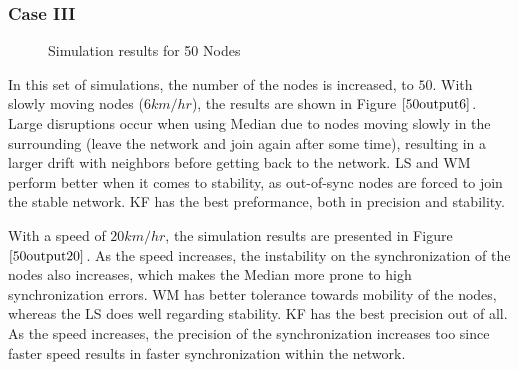 \documentclass[journal]{IEEEtran}
\begin{document}
\subsubsection{\textbf{Case III}}
\begin{figure}
\centerline{  \hfil {}} \caption{Simulation results for 50 Nodes}
\label{50output}
\end{figure}
In this set of simulations, the number of the nodes is increased, to
$50$. With slowly moving nodes ($6km/hr$), the results are shown in
Figure $\ref{50output6}$. Large disruptions occur when using Median
due to nodes moving slowly in the surrounding (leave the network and
join again after some time), resulting in a larger drift with
neighbors before getting back to the network. LS and WM perform
better when it comes to stability, as out-of-sync nodes are forced
to join the stable network. KF has the best preformance, both in
precision and stability. 
\par
With a speed of $20km/hr$, the simulation results are presented in Figure $\ref{50output20}$. As the speed increases, the instability
on the synchronization of the nodes also increases, which makes the Median more prone to high synchronization errors. WM has better
tolerance towards mobility of the nodes, whereas the LS does well regarding stability. KF has the best precision out of all. As the
speed increases, the precision of the synchronization increases too since faster speed results in faster synchronization within the network.
\end{document}
